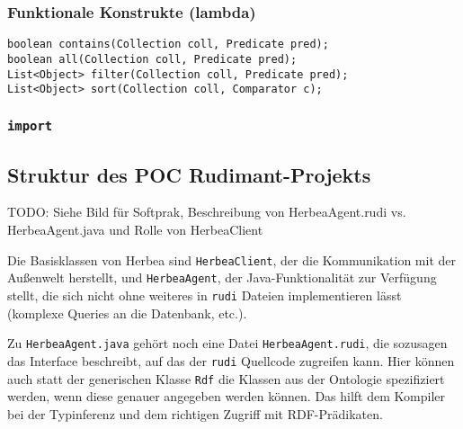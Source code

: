 \subsubsection{Funktionale Konstrukte (lambda)}
\begin{verbatim}
boolean contains(Collection coll, Predicate pred);
boolean all(Collection coll, Predicate pred);
List<Object> filter(Collection coll, Predicate pred);
List<Object> sort(Collection coll, Comparator c);
\end{verbatim}

\subsubsection{\texttt{import}}


\subsection{Struktur des POC Rudimant-Projekts}

TODO: Siehe Bild für Softprak, Beschreibung von HerbeaAgent.rudi
vs. HerbeaAgent.java und Rolle von HerbeaClient

Die Basisklassen von Herbea sind \texttt{HerbeaClient}, der die Kommunikation
mit der Außenwelt herstellt, und \texttt{HerbeaAgent}, der Java-Funktionalität
zur Verfügung stellt, die sich nicht ohne weiteres in \texttt{rudi} Dateien
implementieren lässt (komplexe Queries an die Datenbank, etc.).

Zu \texttt{HerbeaAgent.java} gehört noch eine Datei \texttt{HerbeaAgent.rudi},
die sozusagen das Interface beschreibt, auf das der \texttt{rudi} Quellcode
zugreifen kann. Hier können auch statt der generischen Klasse \texttt{Rdf} die
Klassen aus der Ontologie spezifiziert werden, wenn diese genauer angegeben
werden können. Das hilft dem Kompiler bei der Typinferenz und dem richtigen
Zugriff mit RDF-Prädikaten.

